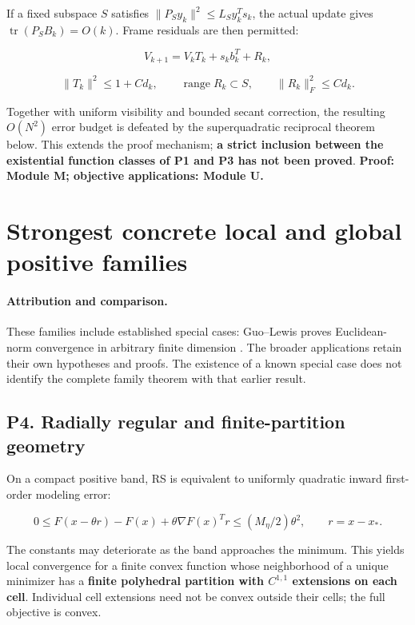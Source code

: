 If a fixed subspace \(S\) satisfies \(\|P_Sy_k\|^2\le L_Sy_k^Ts_k\), the actual update gives \(\operatorname{tr}(P_SB_k)=O(k)\). Frame residuals are then permitted:

\[V_{k+1}=V_kT_k+s_kb_k^T+R_k,\]

\[\|T_k\|^2\le1+Cd_k,\qquad \operatorname{range}R_k\subset S,
\qquad\|R_k\|_F^2\le Cd_k.\]

Together with uniform visibility and bounded secant correction, the resulting \(O(N^2)\) error budget is defeated by the superquadratic reciprocal theorem below. This extends the proof mechanism; \textbf{a strict inclusion between the existential function classes of P1 and P3 has not been proved}. \textbf{Proof: Module M; objective applications: Module U.}

\section{Strongest concrete local and global positive families}\label{strongest-concrete-local-and-global-positive-families}
\paragraph{Attribution and comparison.}
These families include established special cases: Guo--Lewis proves Euclidean-norm convergence in arbitrary finite dimension \cite[Corollary 4.2]{GL18}. The broader applications retain their own hypotheses and proofs. The existence of a known special case does not identify the complete family theorem with that earlier result.


\subsection{P4. Radially regular and finite-partition geometry}\label{p4.-radially-regular-and-finite-partition-geometry}

On a compact positive band, RS is equivalent to uniformly quadratic inward first-order modeling error:

\[
 0\le F(x-\theta r)-F(x)+\theta\nabla F(x)^Tr
 \le(M_\eta/2)\theta^2,\qquad r=x-x_*.
\]

The constants may deteriorate as the band approaches the minimum. This yields local convergence for a finite convex function whose neighborhood of a unique minimizer has a \textbf{finite polyhedral partition with \(C^{1,1}\) extensions on each cell}. Individual cell extensions need not be convex outside their cells; the full objective is convex.

